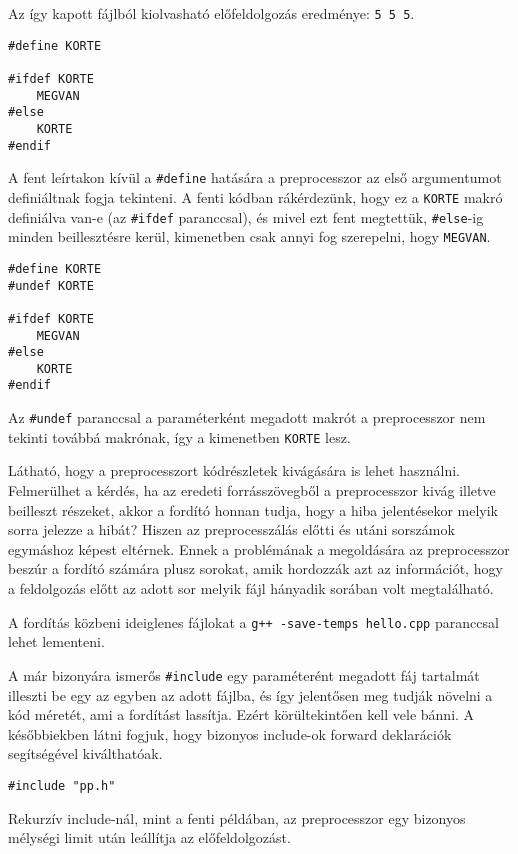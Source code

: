\documentclass[../cpp_book/cpp_book.tex]{subfiles}
\begin{document}
	Az így kapott fájlból kiolvasható előfeldolgozás eredménye: \texttt{5 5 5}.
	\bigskip
	
	\begin{lstlisting}
#define KORTE

#ifdef KORTE
	MEGVAN
#else
	KORTE
#endif
	\end{lstlisting}
	A fent leírtakon kívül a \texttt{\#define} hatására a preprocesszor az első argumentumot definiáltnak fogja tekinteni. A fenti kódban rákérdezünk, hogy ez a \texttt{KORTE} makró definiálva van-e (az \texttt{\#ifdef} paranccsal), és mivel ezt fent megtettük, \texttt{\#else}-ig minden beillesztésre kerül, kimenetben csak annyi fog szerepelni, hogy \texttt{MEGVAN}.
	\bigskip
	
	\begin{lstlisting}
#define KORTE
#undef KORTE

#ifdef KORTE
	MEGVAN
#else
	KORTE
#endif
	\end{lstlisting}
	Az \texttt{\#undef} paranccsal a paraméterként megadott makrót a preprocesszor nem tekinti továbbá makrónak, így a kimenetben \texttt{KORTE} lesz.
	
	Látható, hogy a preprocesszort kódrészletek kivágására is lehet használni. 
  Felmerülhet a kérdés, ha az eredeti forrásszövegből a preprocesszor kivág illetve beilleszt részeket, akkor a fordító honnan tudja, hogy a hiba jelentésekor melyik sorra jelezze a hibát? Hiszen az preprocesszálás előtti és utáni sorszámok egymáshoz képest eltérnek. Ennek a problémának a megoldására az preprocesszor beszúr a fordító számára plusz sorokat, amik hordozzák azt az információt, hogy a feldolgozás előtt az adott sor melyik fájl hányadik sorában volt megtalálható. 
	\begin{note}
		 A fordítás közbeni ideiglenes fájlokat a \texttt{g++ -save-temps hello.cpp} paranccsal lehet lementeni.
	\end{note}
	A már bizonyára ismerős \texttt{\#include} egy paraméterént megadott fáj tartalmát illeszti be egy az egyben az adott fájlba, és így jelentősen meg tudják növelni a kód méretét, ami a fordítást lassítja. Ezért körültekintően kell vele bánni. A későbbiekben látni fogjuk, hogy bizonyos include-ok forward deklarációk segítségével kiválthatóak.
	\bigskip
	
	\begin{lstlisting}
#include "pp.h"
	\end{lstlisting}
		
	Rekurzív include-nál, mint a fenti példában, az preprocesszor egy bizonyos mélységi limit után leállítja az előfeldolgozást.
	
\end{document}
